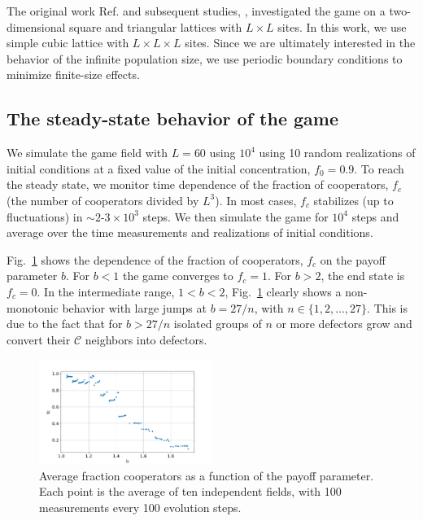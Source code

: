 \documentclass[a4paper]{jpconf}
\begin{document}
The original work Ref. \cite{Nowak1992, Nowak1993} and subsequent studies, \cite{Kolotev2018, Burovski2019},
investigated the game on a two-dimensional square and triangular lattices with $L\times L$ sites.
In this work, we use simple cubic lattice with $L\times L \times L$ sites.
Since we are ultimately interested in the behavior of the infinite population size, 
we use periodic boundary conditions to minimize finite-size effects.

\subsection{The steady-state behavior of the game}
\label{subsec:fc}

We simulate the game field with $L=60$ using $10^4$ using 10 random realizations of initial conditions at a fixed value of the initial concentration, $f_0 = 0.9$.
To reach the steady state, we monitor time dependence of the fraction of cooperators, $f_c$ (the number of cooperators divided by $L^3$). 
In most cases, $f_c$ stabilizes (up to fluctuations) in $\sim 2$-$3 \times 10^3$ steps.  
We then simulate the game for $10^4$ steps and average over the time measurements and realizations of initial conditions.

Fig.\ \ref{fig:Fc} shows the dependence of the fraction of cooperators, $f_c$ on the payoff parameter $b$. 
For $b < 1$ the game converges to $f_c = 1$. For $b > 2$, the end state is $f_c = 0$. In the intermediate range, $1 < b < 2$, Fig.\ \ref{fig:Fc} clearly shows a non-monotonic behavior with large jumps at 
$b = 27 / n$, with $n\in\{1, 2, \ldots, 27\} $. This is due to the fact that for $b > 27/n$ isolated groups of $n$ or more defectors grow and convert their $\mathcal{C}$ neighbors into defectors.

\begin{figure}[H]
	\centering
	
	\includegraphics[width=0.5\textwidth]{C_0.9_graph.png}
	\caption{Average fraction cooperators as a function of the payoff parameter. Each point is the average of ten independent fields, with 100 measurements every 100 evolution steps.}
	\label{fig:Fc}
\end{figure}
\end{document}
